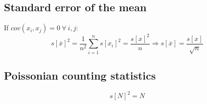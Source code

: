 \documentclass{article}
\begin{document}
\begin{multicols}{3}
\begin{enumerate}
\end{enumerate}

\subsection{Standard error of the mean}

If $cov(x_i,x_j)=0 ~\forall~ i, j$:
\begin{equation}
s[\overline{x}]^2 = \frac{1}{n^2} \sum_{i=1}^{n} s[x_i]^2 =
\frac{s[x]^2}{n} \Rightarrow s[\overline{x}] = \frac{s[x]}{\sqrt{n}}
\label{eq:varianceofthemean}
\end{equation}

\subsection{Poissonian counting statistics}

\begin{equation}
  s[N]^2 = N
\end{equation}

\end{multicols}
\end{document}
